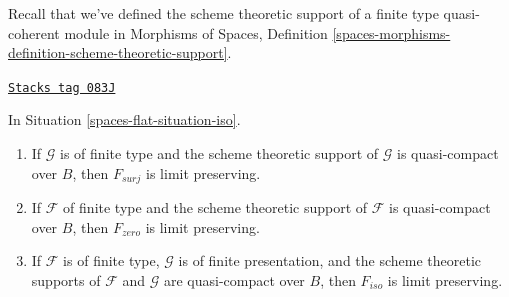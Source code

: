 Recall that we've defined the scheme theoretic support of a finite
type quasi-coherent module in Morphisms of Spaces, Definition
\ref{spaces-morphisms-definition-scheme-theoretic-support}.

\begin{lemma}
\label{spaces-flat-lemma-iso-limits}
\href{https://stacks.math.columbia.edu/tag/083J}{\texttt{Stacks tag 083J}}

In Situation \ref{spaces-flat-situation-iso}.
\begin{enumerate}
\item If $\mathcal{G}$ is of finite type and the scheme theoretic support
of $\mathcal{G}$ is quasi-compact over $B$, then $F_{surj}$ is limit
preserving.
\item If $\mathcal{F}$ of finite type and the scheme theoretic support
of $\mathcal{F}$ is quasi-compact over $B$, then
$F_{zero}$ is limit preserving.
\item If $\mathcal{F}$ is of finite type,
$\mathcal{G}$ is of finite presentation, and the
scheme theoretic supports of $\mathcal{F}$ and $\mathcal{G}$ are
quasi-compact over $B$, then $F_{iso}$ is limit preserving.
\end{enumerate}
\end{lemma}

